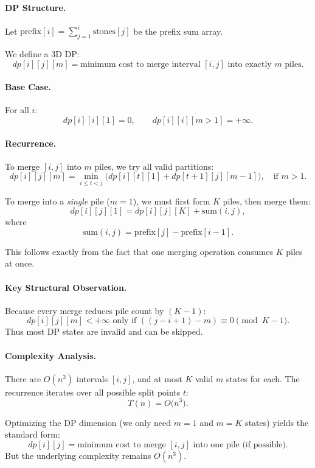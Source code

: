 \documentclass[9pt]{extarticle}
\begin{document}
\paragraph{DP Structure.}
Let $\text{prefix}[i] = \sum_{j=1}^{i} \text{stones}[j]$ be the prefix sum array.

We define a 3D DP:
\[
  dp[i][j][m] = \text{minimum cost to merge interval } [i,j]
  \text{ into exactly } m \text{ piles}.
\]

\paragraph{Base Case.}
For all $i$:
\[
  dp[i][i][1] = 0, \qquad
  dp[i][i][m>1] = +\infty.
\]

\paragraph{Recurrence.}
To merge $[i,j]$ into $m$ piles, we try all valid partitions:
\[
  dp[i][j][m]
  = \min_{i \le t < j}
      \bigl( dp[i][t][1] + dp[t+1][j][m-1] \bigr),
  \quad\text{if } m > 1.
\]

To merge into a \emph{single} pile ($m=1$), we must first form $K$ piles, then merge them:
\[
  dp[i][j][1]
    = dp[i][j][K] + \text{sum}(i,j),
\]
where
\[
  \text{sum}(i,j) = \text{prefix}[j] - \text{prefix}[i-1].
\]

This follows exactly from the fact that one merging operation consumes $K$ piles at once.

\paragraph{Key Structural Observation.}
Because every merge reduces pile count by $(K-1)$:
\[
  dp[i][j][m] < +\infty \text{ only if }
  ( (j-i+1) - m ) \equiv 0 \pmod{K-1}.
\]
Thus most DP states are invalid and can be skipped.

\paragraph{Complexity Analysis.}
There are $O(n^2)$ intervals $[i,j]$, and at most $K$ valid $m$ states for each.  
The recurrence iterates over all possible split points $t$:
\[
  T(n) = O\bigl( n^3 \bigr).
\]

Optimizing the DP dimension (we only need $m=1$ and $m=K$ states) yields the standard form:
\[
  dp[i][j] = \text{minimum cost to merge } [i,j] \text{ into one pile (if possible)}.
\]
But the underlying complexity remains $O(n^3)$.
\end{document}
